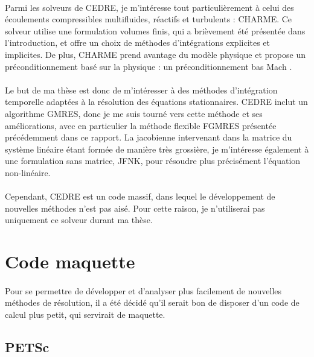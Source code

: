   \paragraph{}
  Parmi les solveurs de CEDRE, je m'intéresse tout particulièrement à celui des écoulements compressibles multifluides, réactifs et turbulents : CHARME.
  Ce solveur utilise une formulation volumes finis, qui a brièvement été présentée dans l'introduction, et offre un choix de méthodes d'intégrations explicites et implicites.
  De plus, CHARME prend avantage du modèle physique et propose un préconditionnement basé sur la physique : un préconditionnement bas Mach \cite{Turkel1987}.

  \paragraph{}
  Le but de ma thèse est donc de m'intéresser à des méthodes d'intégration temporelle adaptées à la résolution des équations stationnaires.
  CEDRE inclut un algorithme GMRES, donc je me suis tourné vers cette méthode et ses améliorations, avec en particulier la méthode flexible FGMRES présentée précédemment dans ce rapport.
  La jacobienne intervenant dans la matrice du système linéaire étant formée de manière très grossière, je m'intéresse également à une formulation sans matrice, JFNK, pour résoudre plus précisément l'équation non-linéaire.

  \paragraph{}
  Cependant, CEDRE est un code massif, dans lequel le développement de nouvelles méthodes n'est pas aisé.
  Pour cette raison, je n'utiliserai pas uniquement ce solveur durant ma thèse.


\section{Code maquette}

  \paragraph{}
  Pour se permettre de développer et d'analyser plus facilement de nouvelles méthodes de résolution, il a été décidé qu'il serait bon de disposer d'un code de calcul plus petit, qui servirait de maquette.

  \subsection{PETSc}

